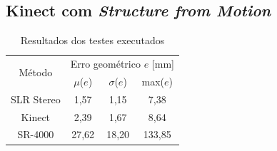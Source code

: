 \documentclass[table, usenames, svgnames, xcolor=dvipsnames]{beamer}
\begin{document}
\subsection{Kinect com \emph{Structure from Motion}}
\begin{frame}
	\begin{center}
		\begin{table}[htbp]
\caption{Resultados dos testes executados}
\label{tab:resultadosKinect}
\begin{center}
\begin{tabular}{|c|c|c|c|}
\hline
\multirow{2}{1.5cm}{Método}& \multicolumn{3}{p{5cm}|}{Erro geométrico $e$ [mm]} \bigstrut \\
\cline{2-4} & \multicolumn{1}{c|}{$\mu$($e$)} & \multicolumn{1}{c|}{$\sigma$($e$)} & \multicolumn{1}{c|}{max($e$)} \bigstrut \\ \hline
SLR Stereo & 1,57 & 1,15 & 7,38 \bigstrut \\ \hline
Kinect & 2,39 & 1,67 & 8,64 \bigstrut \\ \hline
SR-4000 & 27,62 & 18,20 & 133,85 \bigstrut \\ 
\hline
\end{tabular}
\end{center}
\end{table}
	\end{center}
\end{frame}
\end{document}

